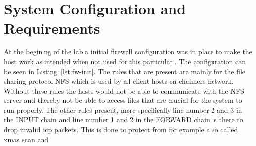 \section{System Configuration and Requirements}
\label{sec:setup}




At the begining of the lab a initial firewall configuration was in place to make the host work as intended when not used for this particular \lab. The configuration can be seen in Listing~\ref{lst:fw-init}. The rules that are present are mainly for the file sharing protocol NFS which is used by all client hosts on chalmers network. Without these rules the hosts would not be able to communicate with the NFS server and thereby not be able to access files that are crucial for the system to run properly. The other rules present, more specifically line number 2 and 3 in the INPUT chain and line number 1 and 2 in the FORWARD chain is there to drop invalid tcp packets. This is done to protect from for example a so called xmas scan and   




